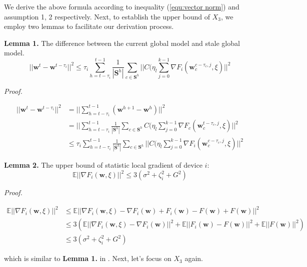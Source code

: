 \documentclass{article}
\begin{document}
We derive the above formula according to inequality (\ref{equ:vector norm}) and assumption 1, 2 respectively. Next, to establish the upper bound of $X_3$, we employ two lemmas to facilitate our derivation process.

\textbf{Lemma 1.} The difference between the current global model and stale global model.
\begin{equation}
    ||\mathbf{w}^{t} - \mathbf{w}^{t-\tau_i}||^2  
\le \tau_i\sum_{h = t - \tau_i}^{t - 1}\frac{1}{|\mathbf{S}^h|}\sum_{c \in \mathbf{S}^h}||C(\eta_l \sum_{j = 0}^{k - 1} \nabla F_i(\mathbf{w}_c^{c-\tau_c, j},\xi)||^2
\label{lemma1}
\end{equation}

\textit{Proof.}

\begin{align*}
||\mathbf{w}^{t} - \mathbf{w}^{t-\tau_i}||^2 &= ||\sum_{h = t - \tau_i}^{t - 1}(\mathbf{w}^{h+ 1} - \mathbf{w}^{h})||^2
\\
&= ||\sum_{h = t - \tau_i}^{t - 1}\frac{1}{|\mathbf{S}^h|}\sum_{c \in \mathbf{S}^h}C(\eta_l \sum_{j = 0}^{k - 1} \nabla F_c(\mathbf{w}_c^{t-\tau_c, j},\xi)||^2
\\
&\le \tau_i\sum_{h = t - \tau_i}^{t - 1}\frac{1}{|\mathbf{S}^h|}\sum_{c \in \mathbf{S}^h}||C(\eta_l \sum_{j = 0}^{k - 1} \nabla F_i(\mathbf{w}_c^{c-\tau_c, j},\xi)||^2
\end{align*}

\textbf{Lemma 2.} The upper bound of statistic local gradient of device $i$:
\begin{equation}
    \mathbb{E}||\nabla F_i(\mathbf{w},\xi)||^2 \le 3(\sigma^2 + \zeta_i^2 + G^2)
\label{lemma2}
\end{equation}

\textit{Proof.}

\begin{align*}
\mathbb{E}||\nabla F_i(\mathbf{w},\xi)||^2 &\le \mathbb{E}||\nabla F_i(\mathbf{w},\xi) - \nabla F_i(\mathbf{w}) + F_i(\mathbf{w}) - F(\mathbf{w}) + F(\mathbf{w})||^2
\\
&\le 3(\mathbb{E}||\nabla F_i(\mathbf{w},\xi) - \nabla F_i(\mathbf{w})||^2 + \mathbb{E}||F_i(\mathbf{w}) - F(\mathbf{w})||^2 + \mathbb{E}||F(\mathbf{w})||^2)
\\
&\le 3(\sigma^2 + \zeta_i^2 + G^2)
\end{align*}

which is similar to \textbf{Lemma 1.} in \cite{fedbuffer}. Next, let's focus on $X_3$ again.
\end{document}
